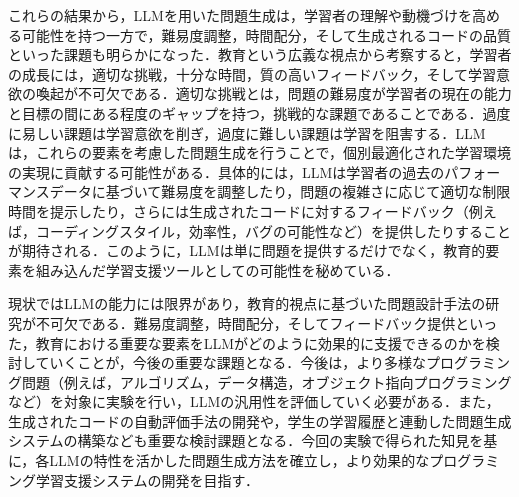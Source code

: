 \documentclass[11pt]{jreport}
\begin{document}
これらの結果から，LLMを用いた問題生成は，学習者の理解や動機づけを高める可能性を持つ一方で，難易度調整，時間配分，そして生成されるコードの品質といった課題も明らかになった．教育という広義な視点から考察すると，学習者の成長には，適切な挑戦，十分な時間，質の高いフィードバック，そして学習意欲の喚起が不可欠である．適切な挑戦とは，問題の難易度が学習者の現在の能力と目標の間にある程度のギャップを持つ，挑戦的な課題であることである．過度に易しい課題は学習意欲を削ぎ，過度に難しい課題は学習を阻害する．LLMは，これらの要素を考慮した問題生成を行うことで，個別最適化された学習環境の実現に貢献する可能性がある．具体的には，LLMは学習者の過去のパフォーマンスデータに基づいて難易度を調整したり，問題の複雑さに応じて適切な制限時間を提示したり，さらには生成されたコードに対するフィードバック（例えば，コーディングスタイル，効率性，バグの可能性など）を提供したりすることが期待される．このように，LLMは単に問題を提供するだけでなく，教育的要素を組み込んだ学習支援ツールとしての可能性を秘めている．

現状ではLLMの能力には限界があり，教育的視点に基づいた問題設計手法の研究が不可欠である．難易度調整，時間配分，そしてフィードバック提供といった，教育における重要な要素をLLMがどのように効果的に支援できるのかを検討していくことが，今後の重要な課題となる．今後は，より多様なプログラミング問題（例えば，アルゴリズム，データ構造，オブジェクト指向プログラミングなど）を対象に実験を行い，LLMの汎用性を評価していく必要がある．また，生成されたコードの自動評価手法の開発や，学生の学習履歴と連動した問題生成システムの構築なども重要な検討課題となる．今回の実験で得られた知見を基に，各LLMの特性を活かした問題生成方法を確立し，より効果的なプログラミング学習支援システムの開発を目指す．


\end{document}
